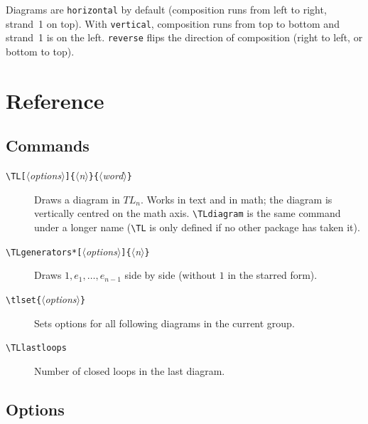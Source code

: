 \documentclass[11pt]{article}
\newenvironment{result}{\par\smallskip\noindent\hspace*{1em}}{\par\medskip}
\newcommand\opt[1]{\texttt{#1}}
\newcommand\cs[1]{\texttt{\textbackslash#1}}
\newcommand\meta[1]{\ensuremath{\langle}\textit{#1}\ensuremath{\rangle}}
\newcommand\marg[1]{\texttt{\{}\meta{#1}\texttt{\}}}
\newcommand\oarg[1]{\texttt{[}\meta{#1}\texttt{]}}
\begin{document}
Diagrams are \opt{horizontal} by default (composition runs from left to
right, strand~1 on top). With \opt{vertical}, composition runs from top to
bottom and strand~1 is on the left. \opt{reverse} flips the direction of
composition (right to left, or bottom to top).

\begin{code}
  
  
\end{code}
\begin{result}
  \quad
  \quad
  \quad
  \quad
\end{result}

\section{Reference}

\subsection{Commands}

\begin{description}
  \item[\cs{TL}\oarg{options}\marg{n}\marg{word}] Draws a diagram in
    $TL_n$. Works in text and in math; the diagram is vertically centred on
    the math axis. \cs{TLdiagram} is the same command under a longer name
    (\cs{TL} is only defined if no other package has taken it).
  \item[\cs{TLgenerators}\texttt{*}\oarg{options}\marg{n}] Draws
    $1,e_1,\dots,e_{n-1}$ side by side (without $1$ in the starred form).
  \item[\cs{tlset}\marg{options}] Sets options for all following diagrams in
    the current group.
  \item[\cs{TLlastloops}] Number of closed loops in the last diagram.
\end{description}

\subsection{Options}
\end{document}
